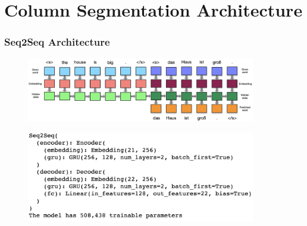 \documentclass[usenames,dvipsnames]{beamer}
\begin{document}


\section{Column Segmentation Architecture}

\begin{frame}
  \frametitle{Seq2Seq Architecture}
  \begin{figure}
    \centering
    \includegraphics[width=10cm, valign=c]{assets/enc-dec}
  \end{figure}
  \begin{figure}
    \centering
    \includegraphics[width=10cm, valign=c]{assets/col-seq2seq}
  \end{figure}
\end{frame}


\end{document}
